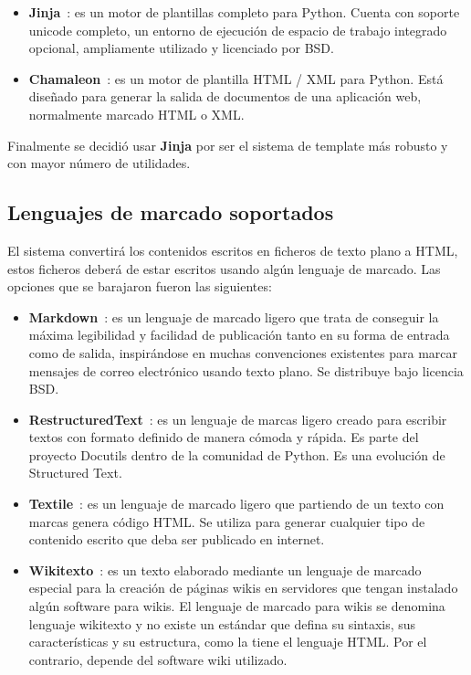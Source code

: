 \begin{itemize}
\item \textbf{Jinja}~\cite{jinja}: es un motor de plantillas completo para Python. Cuenta con soporte unicode completo,
un entorno de ejecución de espacio de trabajo integrado opcional, ampliamente utilizado y licenciado por BSD.
\item \textbf{Chamaleon}~\cite{chamaleon}: es un motor de plantilla HTML / XML para Python. Está diseñado para generar
la salida de documentos de una aplicación web, normalmente marcado HTML o XML.
\end{itemize}

Finalmente se decidió usar \textbf{Jinja} por ser el sistema de template más robusto y con mayor número de utilidades.

\subsection{Lenguajes de marcado soportados}

El sistema convertirá los contenidos escritos en ficheros de texto plano a HTML, estos ficheros deberá de estar escritos
usando algún lenguaje de marcado. Las opciones que se barajaron fueron las siguientes:

\begin{itemize}
\item \textbf{Markdown}~\cite{markdown}: es un lenguaje de marcado ligero que trata de conseguir la máxima legibilidad y facilidad
de publicación tanto en su forma de entrada como de salida, inspirándose en muchas convenciones existentes para marcar mensajes
de correo electrónico usando texto plano. Se distribuye bajo licencia BSD.
\item \textbf{RestructuredText}~\cite{restructuredtext}: es un lenguaje de marcas ligero creado para escribir textos con formato definido de manera cómoda
y rápida. Es parte del proyecto Docutils dentro de la comunidad de Python. Es una evolución de Structured Text.
\item \textbf{Textile}~\cite{textile}: es un lenguaje de marcado ligero que partiendo de un texto con marcas genera código HTML.
Se utiliza para generar cualquier tipo de contenido escrito que deba ser publicado en internet.
\item \textbf{Wikitexto}~\cite{wikitexto}: es un texto elaborado mediante un lenguaje de marcado especial para la creación de páginas wikis
en servidores que tengan instalado algún software para wikis. El lenguaje de marcado para wikis se denomina lenguaje wikitexto
y no existe un estándar que defina su sintaxis, sus características y su estructura, como la tiene el lenguaje HTML. Por el
contrario, depende del software wiki utilizado.
\end{itemize}

